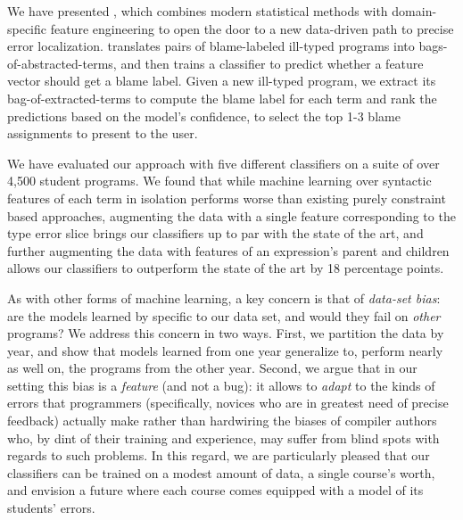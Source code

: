 \label{sec:conclusion}

We have presented \toolname, which
combines modern statistical methods
with domain-specific feature engineering
to open the door to a new data-driven
path to precise error localization.
%
\toolname
translates pairs of
blame-labeled ill-typed
programs into bags-of-abstracted-terms,
and then trains a classifier
to predict whether a feature vector
should get a blame label.
%
Given a new ill-typed program,
we extract its bag-of-extracted-terms
to compute the blame label for each
term and rank the predictions based
on the model's confidence, to select
the top 1-3 blame assignments to
present to the user.

We have evaluated our approach with
five different classifiers on a suite
of over 4,500 student programs.
%
We found that while machine learning
over syntactic features of each term in isolation
performs worse than existing
purely constraint based approaches, %
augmenting the data with a single feature corresponding to
the type error slice brings our
classifiers up to par with the state of the art,
and further augmenting the data with
features of an expression's parent and children
allows our classifiers to outperform
the state of the art by 18 percentage points.



As with other forms of machine learning,
a key concern is that of \emph{data-set bias}: are
the models learned by \toolname specific
to our data set, and would they fail on
\emph{other} \ocaml programs?
%
We address this concern in two ways.
%
First, we partition the data by year,
and show that models learned from one
year generalize to, \ie perform nearly
as well on, the programs from the other
year.
%
Second, we argue that in our setting
this bias is a \emph{feature} (and not
a bug): it allows \toolname to \emph{adapt}
to the kinds of errors that programmers
(specifically, novices who are in greatest
need of precise feedback) actually make
rather than hardwiring the biases of
compiler authors who, by dint of their
training and experience, may suffer from
blind spots with regards to such problems.
%
In this regard, we are particularly pleased
that our classifiers can be trained on a
modest amount of data, \ie a single course's
worth, and envision a future where each course
comes equipped with a model of its students' errors.



